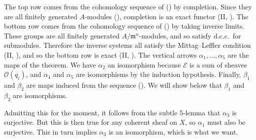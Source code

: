 {{}\par\smallskip\noindent
The top row comes from the cohomology sequence of () by completion. Since they are all finitely generated $A$-modules (), completion is an exact functor (II, ). The bottom row comes from the cohomology sequence of () by taking inverse limits. These groups are all finitely generated $A/\mathfrak m^n$-modules, and so satisfy d.c.c.\ for submodules. Therefore the inverse systems all satisfy the Mittag--Leffler condition (II, ), and so the bottom row is exact (II, ). The vertical arrows $\alpha_1,\ldots,\alpha_5$ are the maps of the theorem. We have $\alpha_2$ an isomorphism because $\mathcal E$ is a sum of sheaves $\mathcal O(q_i)$, and $\alpha_4$ and $\alpha_5$ are isomorphisms by the induction hypothesis. Finally, $\beta_1$ and $\beta_2$ are maps induced from the sequence (). We will show below that $\beta_1$ and $\beta_2$ are isomorphisms.

Admitting this for the moment, it follows from the subtle 5-lemma that $\alpha_3$ is surjective. But this is then true for any coherent sheaf on $X$, so $\alpha_1$ must also be surjective. This in turn implies $\alpha_3$ is an isomorphism, which is what we want.
}
